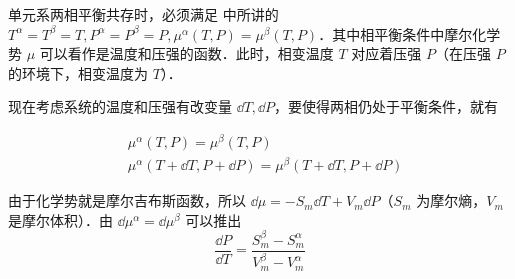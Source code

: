 
\begin{issues}
\issueDraft
\end{issues}


单元系两相平衡共存时，必须满足 中所讲的 $T^\alpha=T^\beta=T,P^\alpha=P^\beta=P,\mu^\alpha(T,P)=\mu^\beta(T,P)$．其中相平衡条件中摩尔化学势 $\mu$ 可以看作是温度和压强的函数．此时，相变温度 $T$ 对应着压强 $P$（在压强 $P$ 的环境下，相变温度为 $T$）．

现在考虑系统的温度和压强有改变量 $\dd T,\dd P$，要使得两相仍处于平衡条件，就有

\begin{align}
&\mu^\alpha(T,P)=\mu^\beta(T,P)\\
&\mu^\alpha(T+\dd T,P+\dd P)=\mu^\beta(T+\dd T,P+\dd P)
\end{align}

由于化学势就是摩尔吉布斯函数，所以 $\dd\mu=-S_m\dd T+V_m\dd P$（$S_m$ 为摩尔熵，$V_m$ 是摩尔体积）．由 $\dd \mu^\alpha=\dd \mu^\beta$ 可以推出
\begin{equation}
\frac{\dd P}{\dd T}=\frac{S^\beta_m-S^\alpha_m}{V^\beta_m-V^\alpha_m}
\end{equation}